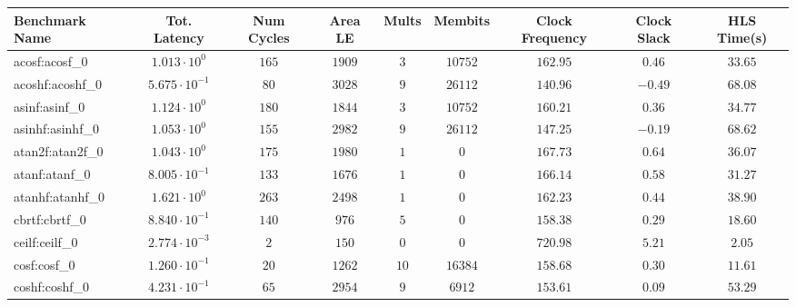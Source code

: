 \begin{tabular}{|l|c|c|c|c|c|c|c|c|}
\hline
Benchmark Name               & Tot. Latency            & Num Cycles & Area LE   & Mults   & Membits    & Clock Frequency & Clock Slack & HLS Time(s) \\
\hline
acosf:acosf\_0               & $ 1.013 \cdot 10^{0}  $ & $ 165    $ & $ 1909  $ & $ 3   $ & $ 10752  $ & $ 162.95      $ & $ 0.46    $ & $ 33.65   $ \\
acoshf:acoshf\_0             & $ 5.675 \cdot 10^{-1} $ & $ 80     $ & $ 3028  $ & $ 9   $ & $ 26112  $ & $ 140.96      $ & $ -0.49   $ & $ 68.08   $ \\
asinf:asinf\_0               & $ 1.124 \cdot 10^{0}  $ & $ 180    $ & $ 1844  $ & $ 3   $ & $ 10752  $ & $ 160.21      $ & $ 0.36    $ & $ 34.77   $ \\
asinhf:asinhf\_0             & $ 1.053 \cdot 10^{0}  $ & $ 155    $ & $ 2982  $ & $ 9   $ & $ 26112  $ & $ 147.25      $ & $ -0.19   $ & $ 68.62   $ \\
atan2f:atan2f\_0             & $ 1.043 \cdot 10^{0}  $ & $ 175    $ & $ 1980  $ & $ 1   $ & $ 0      $ & $ 167.73      $ & $ 0.64    $ & $ 36.07   $ \\
atanf:atanf\_0               & $ 8.005 \cdot 10^{-1} $ & $ 133    $ & $ 1676  $ & $ 1   $ & $ 0      $ & $ 166.14      $ & $ 0.58    $ & $ 31.27   $ \\
atanhf:atanhf\_0             & $ 1.621 \cdot 10^{0}  $ & $ 263    $ & $ 2498  $ & $ 1   $ & $ 0      $ & $ 162.23      $ & $ 0.44    $ & $ 38.90   $ \\
cbrtf:cbrtf\_0               & $ 8.840 \cdot 10^{-1} $ & $ 140    $ & $ 976   $ & $ 5   $ & $ 0      $ & $ 158.38      $ & $ 0.29    $ & $ 18.60   $ \\
ceilf:ceilf\_0               & $ 2.774 \cdot 10^{-3} $ & $ 2      $ & $ 150   $ & $ 0   $ & $ 0      $ & $ 720.98      $ & $ 5.21    $ & $ 2.05    $ \\
cosf:cosf\_0                 & $ 1.260 \cdot 10^{-1} $ & $ 20     $ & $ 1262  $ & $ 10  $ & $ 16384  $ & $ 158.68      $ & $ 0.30    $ & $ 11.61   $ \\
coshf:coshf\_0               & $ 4.231 \cdot 10^{-1} $ & $ 65     $ & $ 2954  $ & $ 9   $ & $ 6912   $ & $ 153.61      $ & $ 0.09    $ & $ 53.29   $ \\

\end{tabular}
